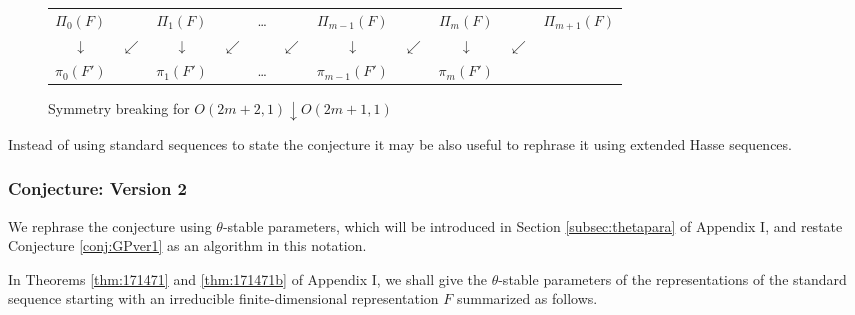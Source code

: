 \medskip
\begin{figure}[htp]
\color{black}
\caption{Symmetry breaking for $O(2m+2,1) \downarrow O(2m+1,1)$ }
\begin{center}
\begin{tabular}{@{}c@{~}c@{~}c@{~}c@{~}c@{~}c@{~}c@{~}c@{~}c@{~}c@{~}c@{}}
$\Pi_0(F)$& &$\Pi_1(F)$ & & \dots &  & $\Pi_{m-1}(F)$& & $\Pi_{m}(F)$ & & $\Pi_{m+1}(F)$\\
$\downarrow$ &$\swarrow$& $\downarrow $& $\swarrow$ &  & $\swarrow$ & $ \downarrow $& $\swarrow $ & $\downarrow$ & $\swarrow$\\
$\pi_0(F')$& &$\pi_1(F')$& &\dots  & & $\pi_{m-1}(F')$ & & $\pi_{m}(F')$ 
\end{tabular}
\end{center}
\label{tab:SBeven}
\end{figure}%

\begin{remark}
Instead of using standard sequences to state the conjecture
 it may be also useful to rephrase it using extended  Hasse sequences.
\end{remark}

\subsubsection{Conjecture: Version 2}
We rephrase the conjecture using $\theta$-stable parameters, 
 which will be introduced
 in Section \ref{subsec:thetapara}
 of Appendix I, 
 and restate Conjecture \ref{conj:GPver1} as an algorithm in this notation.



In Theorems \ref{thm:171471} and \ref{thm:171471b} of Appendix I, 
 we shall give the 
 $\theta $-stable parameters
 of the representations of the standard sequence starting
 with an irreducible finite-dimensional representation $F$
 summarized as follows.

